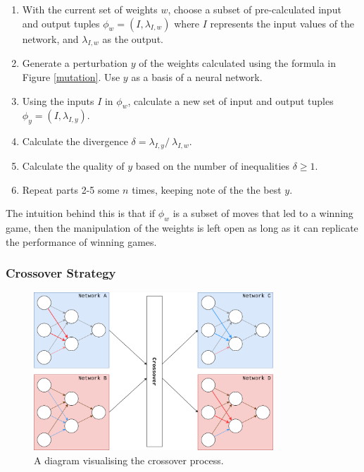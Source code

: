 \documentclass[12pt,a4paper]{article}
\begin{document}
             \begin{enumerate}
             \item With the current set of weights $w$, choose a subset of pre-calculated input and output tuples $\phi_{w} = (I, \lambda_{I,w})$ where $I$ represents the input values of the network, and $\lambda_{I,w}$ as the output.
             \item Generate a perturbation $y$ of the weights calculated using the formula in Figure \ref{mutation}. Use $y$ as a basis of a neural network. 
              \item Using the inputs $I$ in $\phi_{w}$, calculate a new set of input and output tuples $\phi_{y} = (I, \lambda_{I,y})$.
              \item Calculate the divergence $\delta = \lambda_{I,y} /\ \lambda_{I,w}.$ 
              \item Calculate the quality of $y$ based on the number of inequalities $\delta \geq 1$.
             \item Repeat parts 2-5 some $n$ times, keeping note of the the best $y$. 
             \end{enumerate}

            The intuition behind this is that if $\phi_{w}$ is a subset of moves that led to a winning game, then the manipulation of the weights is left open as long as it can replicate the performance of winning games.
            
        \subsubsection{Crossover Strategy} \label{crossover_strategy}
      
           \begin{figure}[!ht]
                \centering
                \includegraphics[width=90mm]{images/crossover.png}
                \caption{A diagram visualising the crossover process.\label{crossoverpic}}
            \end{figure}
\end{document}
